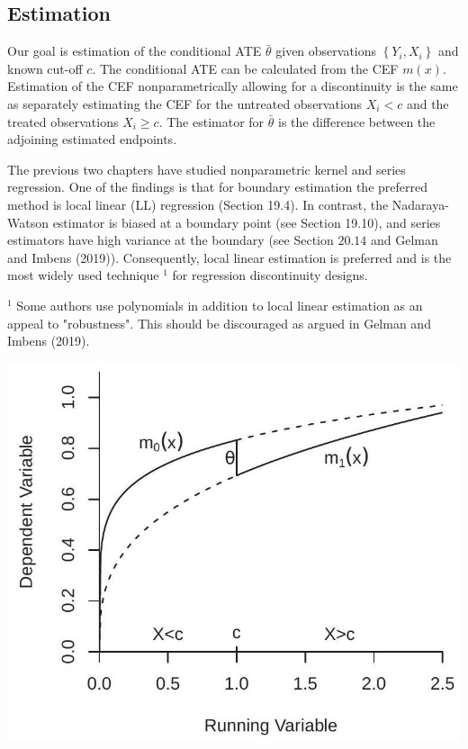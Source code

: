\documentclass[10pt]{article}
\begin{document}
\subsection{Estimation}
Our goal is estimation of the conditional ATE $\bar{\theta}$ given observations $\left\{Y_{i}, X_{i}\right\}$ and known cut-off $c$. The conditional ATE can be calculated from the CEF $m(x)$. Estimation of the CEF nonparametrically allowing for a discontinuity is the same as separately estimating the CEF for the untreated observations $X_{i}<c$ and the treated observations $X_{i} \geq c$. The estimator for $\bar{\theta}$ is the difference between the adjoining estimated endpoints.

The previous two chapters have studied nonparametric kernel and series regression. One of the findings is that for boundary estimation the preferred method is local linear (LL) regression (Section 19.4). In contrast, the Nadaraya-Watson estimator is biased at a boundary point (see Section 19.10), and series estimators have high variance at the boundary (see Section $20.14$ and Gelman and Imbens (2019)). Consequently, local linear estimation is preferred and is the most widely used technique ${ }^{1}$ for regression discontinuity designs.

${ }^{1}$ Some authors use polynomials in addition to local linear estimation as an appeal to "robustness". This should be discouraged as argued in Gelman and Imbens (2019).

\includegraphics[max width=\textwidth]{2022_10_23_bb8a8d8a5dc56cf142a9g-04}
\end{document}
